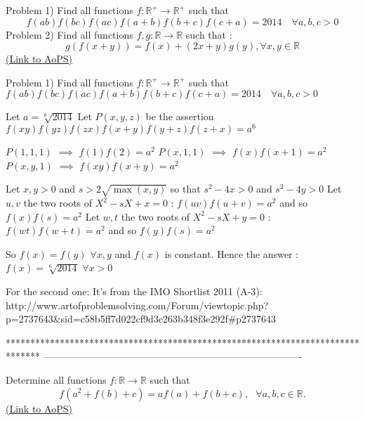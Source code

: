 \begin{problem}
	Problem 1)
Find all functions $f: \mathbb R^{+}\to \mathbb R^{+}$ such that \[f(ab)f(bc)f(ac)f(a+b)f(b+c)f(c+a)=2014 \quad \forall a,b,c> 0\]
Problem 2)
Find all functions $f,g : \mathbb{R}\to \mathbb{R}$ such that :
\[g(f(x+y))=f(x)+(2x+y)g(y), \forall x,y\in\mathbb{R}\]
	\flushright \href{https://artofproblemsolving.com/community/c6h610355}{(Link to AoPS)}
\end{problem}



\begin{solution}
	\begin{tcolorbox}Problem 1)
Find all functions $f: \mathbb R^{+}\to \mathbb R^{+}$ such that $f(ab)f(bc)f(ac)f(a+b)f(b+c)f(c+a)=2014 \quad \forall a,b,c>0$ \end{tcolorbox}
Let $a=\sqrt[6]{2014}$
Let $P(x,y,z)$ be the assertion $f(xy)f(yz)f(zx)f(x+y)f(y+z)f(z+x)=a^6$

$P(1,1,1)$ $\implies$ $f(1)f(2)=a^2$
$P(x,1,1)$ $\implies$ $f(x)f(x+1)=a^2$
$P(x,y,1)$ $\implies$ $f(xy)f(x+y)=a^2$

Let $x,y>0$ and $s>2\sqrt{\max(x,y)}$ so that $s^2-4x>0$ and $s^2-4y>0$
Let $u,v$ the two roots of $X^2-sX+x=0$ : $f(uv)f(u+v)=a^2$ and so $f(x)f(s)=a^2$
Let $w,t$ the two roots of $X^2-sX+y=0$ : $f(wt)f(w+t)=a^2$ and so $f(y)f(s)=a^2$

So $f(x)=f(y)$ $\forall x,y$ and $f(x)$ is constant. Hence the answer : $\boxed{f(x)=\sqrt[6]{2014}}$ $\forall x>0$
\end{solution}



\begin{solution}
	For the second one:
It's from the IMO Shortlist 2011 (A-3):
http://www.artofproblemsolving.com/Forum/viewtopic.php?p=2737643&sid=c58b5ff7d022cf9d3c263b348f3e292f#p2737643
\end{solution}
*******************************************************************************
-------------------------------------------------------------------------------

\begin{problem}
	Determine all functions $f : \mathbb{R} \to \mathbb{R}$ such that \[ f(a^2+f(b)+c) = af(a)+f(b+c)   , \ \ \ \forall a,b,c \in  \mathbb{R}.\]
	\flushright \href{https://artofproblemsolving.com/community/c6h610510}{(Link to AoPS)}
\end{problem}



